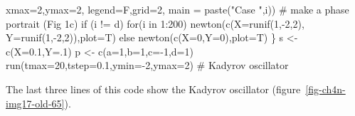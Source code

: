 \documentclass[
  a4paper,
  DIV=11,
  numbers=noendperiod,
  oneside]{scrreprt}
\newenvironment{Shaded}{}{}
\newcommand{\AttributeTok}[1]{\textcolor[rgb]{0.84,0.23,0.29}{#1}}
\newcommand{\CommentTok}[1]{\textcolor[rgb]{0.42,0.45,0.49}{#1}}
\newcommand{\ControlFlowTok}[1]{\textcolor[rgb]{0.84,0.23,0.29}{#1}}
\newcommand{\DecValTok}[1]{\textcolor[rgb]{0.00,0.36,0.77}{#1}}
\newcommand{\FloatTok}[1]{\textcolor[rgb]{0.00,0.36,0.77}{#1}}
\newcommand{\FunctionTok}[1]{\textcolor[rgb]{0.44,0.26,0.76}{#1}}
\newcommand{\NormalTok}[1]{\textcolor[rgb]{0.14,0.16,0.18}{#1}}
\newcommand{\OtherTok}[1]{\textcolor[rgb]{0.44,0.26,0.76}{#1}}
\newcommand{\SpecialCharTok}[1]{\textcolor[rgb]{0.00,0.36,0.77}{#1}}
\newcommand{\StringTok}[1]{\textcolor[rgb]{0.01,0.18,0.38}{#1}}
\begin{document}
\begin{Shaded}
\begin{Highlighting}[]
        \AttributeTok{xmax=}\DecValTok{2}\NormalTok{,}\AttributeTok{ymax=}\DecValTok{2}\NormalTok{, }\AttributeTok{legend=}\NormalTok{F,}\AttributeTok{grid=}\DecValTok{2}\NormalTok{,}
        \AttributeTok{main =} \FunctionTok{paste}\NormalTok{(}\StringTok{"Case "}\NormalTok{,i)) }\CommentTok{\# make a phase portrait (Fig 1c)}
  \ControlFlowTok{if}\NormalTok{ (i }\SpecialCharTok{!=} \StringTok{\textquotesingle{}d\textquotesingle{}}\NormalTok{) }\ControlFlowTok{for}\NormalTok{(i }\ControlFlowTok{in} \DecValTok{1}\SpecialCharTok{:}\DecValTok{200}\NormalTok{) }\FunctionTok{newton}\NormalTok{(}\FunctionTok{c}\NormalTok{(}\AttributeTok{X=}\FunctionTok{runif}\NormalTok{(}\DecValTok{1}\NormalTok{,}\SpecialCharTok{{-}}\DecValTok{2}\NormalTok{,}\DecValTok{2}\NormalTok{),}
        \AttributeTok{Y=}\FunctionTok{runif}\NormalTok{(}\DecValTok{1}\NormalTok{,}\SpecialCharTok{{-}}\DecValTok{2}\NormalTok{,}\DecValTok{2}\NormalTok{)),}\AttributeTok{plot=}\NormalTok{T) }\ControlFlowTok{else}
    \FunctionTok{newton}\NormalTok{(}\FunctionTok{c}\NormalTok{(}\AttributeTok{X=}\DecValTok{0}\NormalTok{,}\AttributeTok{Y=}\DecValTok{0}\NormalTok{),}\AttributeTok{plot=}\NormalTok{T)}
\NormalTok{\}}
\NormalTok{s }\OtherTok{\textless{}{-}} \FunctionTok{c}\NormalTok{(}\AttributeTok{X=}\FloatTok{0.1}\NormalTok{,}\AttributeTok{Y=}\NormalTok{.}\DecValTok{1}\NormalTok{) }
\NormalTok{p }\OtherTok{\textless{}{-}} \FunctionTok{c}\NormalTok{(}\AttributeTok{a=}\DecValTok{1}\NormalTok{,}\AttributeTok{b=}\DecValTok{1}\NormalTok{,}\AttributeTok{c=}\SpecialCharTok{{-}}\DecValTok{1}\NormalTok{,}\AttributeTok{d=}\DecValTok{1}\NormalTok{)}
\FunctionTok{run}\NormalTok{(}\AttributeTok{tmax=}\DecValTok{20}\NormalTok{,}\AttributeTok{tstep=}\FloatTok{0.1}\NormalTok{,}\AttributeTok{ymin=}\SpecialCharTok{{-}}\DecValTok{2}\NormalTok{,}\AttributeTok{ymax=}\DecValTok{2}\NormalTok{) }\CommentTok{\# Kadyrov oscillator}
\end{Highlighting}
\end{Shaded}

The last three lines of this code show the Kadyrov oscillator
(figure~\ref{fig-ch4n-img17-old-65}).
\end{document}
